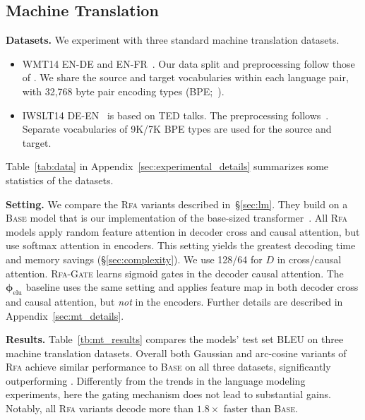 \subsection{Machine Translation}\label{sec:mt}
\textbf{Datasets.} We experiment with three standard machine translation datasets.

\begin{itemize}[nosep,leftmargin=1em,labelwidth=*,align=left]
\item WMT14 EN-DE and EN-FR~\citep{bojar2014wmt}. Our data split and preprocessing follow those of \citet{vaswani2017attention}.
We share the source and target vocabularies within each language pair, with 32,768 byte pair encoding types (BPE;~\citealp{sennrich2016bpe}).
\item IWSLT14 DE-EN~\citep{cettolo2014report} is based on TED talks. The preprocessing follows~\citet{edunov2018classical}.
Separate vocabularies of 9K/7K BPE types are used for the source and target.
\end{itemize}

Table~\ref{tab:data} in Appendix~\ref{sec:experimental_details} summarizes some statistics of the datasets.

\textbf{Setting.}
We compare the \textsc{Rfa} variants described in~\S\ref{sec:lm}.
They build on a \textsc{Base} model that is our implementation of the base-sized transformer~\citep{vaswani2017attention}. All \textsc{Rfa} models apply random feature attention in decoder cross and causal attention, but use softmax attention in encoders. This setting yields the greatest decoding time and memory savings (\S\ref{sec:complexity}).
We use 128/64 for $D$ in cross/causal attention.
\textsc{Rfa-Gate} learns sigmoid gates in the decoder causal attention. The $\boldsymbol{\phi}_{\operatorname{elu}}$ baseline uses the same setting and applies feature map in both decoder cross and causal attention, but \emph{not} in the encoders. Further details are described in Appendix~\ref{sec:mt_details}.

\textbf{Results.}
Table~\ref{tb:mt_results} compares the models' test set BLEU on three machine translation datasets. Overall both Gaussian and arc-cosine variants of \textsc{Rfa}
achieve similar performance to \textsc{Base} on all three datasets, significantly outperforming \citet{katharopoulos20transformers}.
Differently from the trends in the language modeling experiments, here the gating mechanism does not lead to substantial gains. Notably, all \textsc{Rfa} variants decode more than $1.8\times$
faster than \textsc{Base}.

